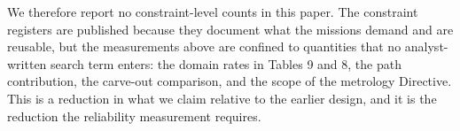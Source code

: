 We therefore report no constraint-level counts in this paper. The constraint registers are published because they document what the missions demand and are reusable, but the measurements above are confined to quantities that no analyst-written search term enters: the domain rates in Tables 9 and 8, the path contribution, the carve-out comparison, and the scope of the metrology Directive. This is a reduction in what we claim relative to the earlier design, and it is the reduction the reliability measurement requires.
